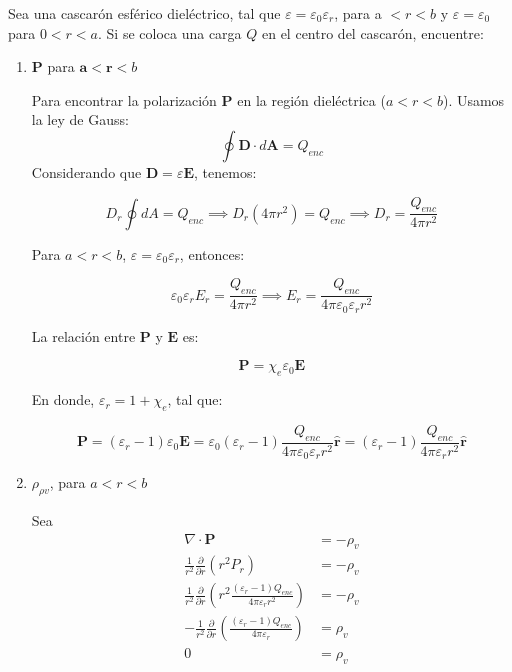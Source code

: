 \begin{problema}
    Sea una cascarón esférico dieléctrico, tal que $\varepsilon=\varepsilon_{0} \varepsilon_{r}$, para a $<r<b$ y $\varepsilon=\varepsilon_{0}$ para $0<r<a$. Si se coloca una carga $Q$ en el centro del cascarón, encuentre:
    \begin{enumerate}
        \item $\mathbf{P}$ para $\mathbf{a}<\mathbf{r}<b$
        \begin{sol}
            Para encontrar la polarización $\mathbf{P}$ en la región dieléctrica ($a<r<b$). Usamos la ley de Gauss:
            $$\oint \mathbf{D} \cdot d\mathbf{A} = Q_{enc}$$
            Considerando que $\mathbf{D} = \varepsilon \mathbf{E}$, tenemos:

$$D_r \oint dA = Q_{enc}\implies D_r (4\pi r^2) = Q_{enc}\implies D_r = \frac{Q_{enc}}{4\pi r^2}$$

Para $a<r<b$, $\varepsilon = \varepsilon_0 \varepsilon_r$, entonces:

$$\varepsilon_0 \varepsilon_r E_r = \frac{Q_{enc}}{4\pi r^2}\implies E_r = \frac{Q_{enc}}{4\pi \varepsilon_0 \varepsilon_r r^2}$$

La relación entre $\mathbf{P}$ y $\mathbf{E}$ es: 

$$\mathbf{P} = \chi_e \varepsilon_0 \mathbf{E}$$

En donde, $\varepsilon_r = 1 + \chi_e$, tal que: 

$$\mathbf{P} = (\varepsilon_r - 1) \varepsilon_0 \mathbf{E}= \varepsilon_0 (\varepsilon_r - 1) \frac{Q_{enc}}{4\pi \varepsilon_0 \varepsilon_r r^2} \hat{\mathbf{r}}=  (\varepsilon_r - 1) \frac{Q_{enc}}{4\pi\varepsilon_r r^2} \hat{\mathbf{r}}$$

        \end{sol}
        \item $\rho_{\rho v}$, para $a<r<b$
        \begin{sol}
            Sea
            \begin{align*}
                \nabla \cdot \mathbf{P} &= -\rho_v\\
                \frac{1}{r^2} \frac{\partial}{\partial r}(r^2 P_r) &= -\rho_v\\
                \frac{1}{r^2} \frac{\partial}{\partial r} \left( r^2 \frac{(\varepsilon_r - 1)Q_{enc}}{4\pi \varepsilon_r r^2} \right) &= -\rho_v\\
                -\frac{1}{r^2} \frac{\partial}{\partial r} \left( \frac{(\varepsilon_r - 1)Q_{enc}}{4\pi \varepsilon_r} \right) &= \rho_v\\
                0 &= \rho_v
            \end{align*}


\end{sol}
\end{enumerate}
\end{problema}
